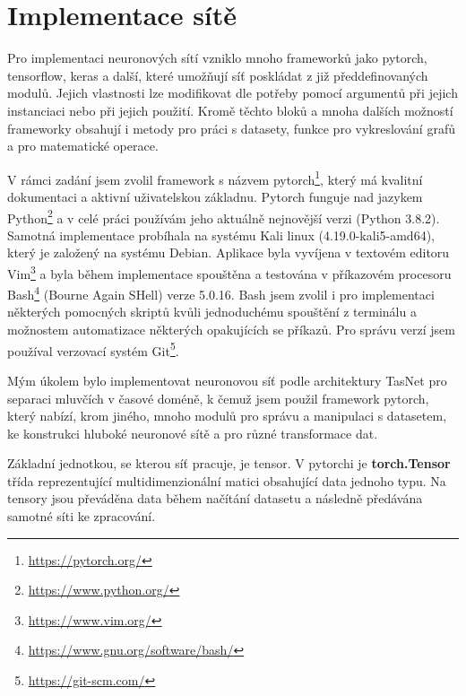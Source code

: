 

\chapter{Implementace sítě}
\label{implementace}
Pro implementaci neuronových sítí vzniklo mnoho frameworků jako pytorch, tensorflow, keras a další, které umožňují síť poskládat z již předdefinovaných modulů. Jejich vlastnosti lze modifikovat dle potřeby pomocí argumentů při jejich instanciaci nebo při jejich použití. Kromě těchto bloků a mnoha dalších možností frameworky obsahují i metody pro práci s datasety, funkce pro vykreslování grafů a pro matematické operace.

V rámci zadání jsem zvolil framework s názvem pytorch\footnote{\url{https://pytorch.org/}}, který má kvalitní dokumentaci a aktivní uživatelskou základnu. Pytorch funguje nad jazykem Python\footnote{\url{https://www.python.org/}} a v celé práci používám jeho aktuálně nejnovější verzi (Python 3.8.2). Samotná implementace probíhala na systému Kali linux (4.19.0-kali5-amd64), který je založený na systému Debian. Aplikace byla vyvíjena v textovém editoru Vim\footnote{\url{https://www.vim.org/}} a byla během implementace spouštěna a testována v příkazovém procesoru Bash\footnote{\url{https://www.gnu.org/software/bash/}} (Bourne Again SHell) verze 5.0.16. Bash jsem zvolil i pro implementaci některých pomocných skriptů kvůli jednoduchému spouštění z terminálu a možnostem automatizace některých opakujících se příkazů. Pro správu verzí jsem používal verzovací systém Git\footnote{\url{https://git-scm.com/}}.


Mým úkolem bylo implementovat neuronovou síť podle architektury TasNet pro separaci mluvčích v časové doméně, k čemuž jsem použil framework pytorch, který nabízí, krom jiného, mnoho modulů pro správu a manipulaci s datasetem, ke konstrukci hluboké neuronové sítě a pro různé transformace dat.


Základní jednotkou, se kterou síť pracuje, je tensor. V pytorchi je \textbf{torch.Tensor} třída reprezentující multidimenzionální matici obsahující data jednoho typu. Na tensory jsou převáděna data během načítání datasetu a následně předávána samotné síti ke zpracování.
\bigskip

